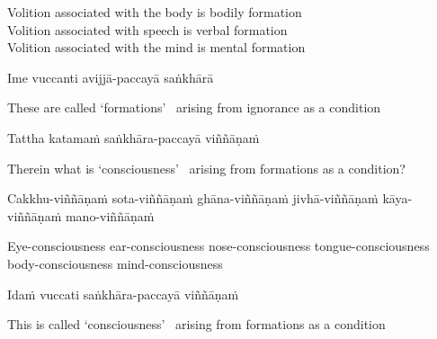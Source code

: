 \begin{english-verses}
  Volition associated with the body is bodily formation\\
  Volition associated with speech is verbal formation\\
  Volition associated with the mind is mental\makeatletter\hyperlink{endnote79-appendix}\makeatother \thinspace
  formation
\end{english-verses}

Ime vuccanti avijjā-paccayā saṅkhārā

\begin{english}
  These are called `formations' \breathmark\ arising from ignorance as a condition
\end{english}

\ifninebythirteenversion\clearpage\fi

Tattha katamaṁ saṅkhāra-paccayā viññāṇaṁ

\begin{english-hang}
  Therein what is `consciousness' \breathmark\ arising from formations as a condition?
\end{english-hang}

\begin{pali-hang}
  Cakkhu-viññāṇaṁ sota-viññāṇaṁ ghāna-viññāṇaṁ jivhā-viññāṇaṁ kāya-viññāṇaṁ mano-viññāṇaṁ
\end{pali-hang}

\begin{english-hang}
  Eye-consciousness ear-consciousness nose-consciousness tongue-consciousness body-consciousness mind-consciousness
\end{english-hang}

Idaṁ vuccati saṅkhāra-paccayā viññāṇaṁ

\begin{english}
  This is called `consciousness' \breathmark\ arising from formations as a condition
\end{english}

